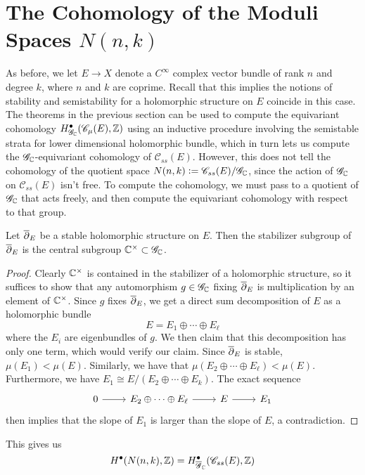 %
\section{The Cohomology of the Moduli Spaces $N(n,k)$}
%
As before, we let $E \to X$ denote a $C^\infty$ complex vector bundle of
rank $n$ and degree $k$, where $n$ and $k$ are coprime. Recall that this
implies the notions of stability and semistability for a holomorphic structure
on $E$ coincide in this case.\\

The theorems in the previous section can be used to compute the
equivariant cohomology $H^\bullet_{\mathscr{G}_{\mathbb{C}}}(\mathscr{C}_\mu(E),\mathbb{Z})$
using an inductive procedure involving the semistable strata for lower dimensional
holomorphic bundle, which in turn lets us compute the $\mathscr{G}_{\mathbb{C}}$-equivariant
cohomology of $\mathscr{C}_{ss}(E)$. However, this does not tell the cohomology
of the quotient space $N(n,k) \vcentcolon= \mathscr{C}_{ss}(E)/\mathscr{G}_{\mathbb{C}}$, since
the action of $\mathscr{G}_{\mathbb{C}}$ on $\mathscr{C}_{ss}(E)$ isn't free. To compute
the cohomology, we must pass to a quotient of $\mathscr{G}_{\mathbb{C}}$ that acts freely,
and then compute the equivariant cohomology with respect to that group.
%
\begin{prop}
Let $\overline{\partial}_E$ be a stable holomorphic structure on $E$. Then the stabilizer
subgroup of $\overline{\partial}_E$ is the central subgroup $\mathbb{C}^\times \subset \mathscr{G}_{\mathbb{C}}$.
\end{prop}
%
\begin{proof}
Clearly $\mathbb{C}^\times$ is contained in the stabilizer of a holomorphic structure,
so it suffices to show that any automorphism $g \in \mathscr{G}_{\mathbb{C}}$ fixing
$\overline{\partial}_E$ is multiplication by an element of $\mathbb{C}^\times$. Since $g$
fixes $\overline{\partial}_E$, we get a direct sum decomposition of $E$ as a holomorphic bundle
\[
E = E_1 \oplus \cdots \oplus E_\ell
\]
where the $E_i$ are eigenbundles of $g$. We then claim that this decomposition
has only one term, which would verify our claim. Since $\overline{\partial}_E$ is stable,
$\mu(E_1) < \mu(E)$. Similarly, we have that
$\mu(E_2 \oplus\cdots\oplus E_\ell) < \mu(E)$.
Furthermore, we have $E_1 \cong E/(E_2\oplus\cdots\oplus E_k)$.
The exact sequence
\[\begin{tikzcd}
0 \ar[r] & E_2\oplus\cdots\oplus E_\ell \ar[r] & E \ar[r] & E_1
\end{tikzcd}\]
then implies that the slope of $E_1$ is larger than the slope of $E$, a contradiction.
\end{proof}
%
This gives us
\[
H^\bullet(N(n,k),\mathbb{Z}) = H^\bullet_{\overline{\mathscr{G}}_{\mathbb{C}}}(\mathscr{C}_{ss}(E),\mathbb{Z})
\]

